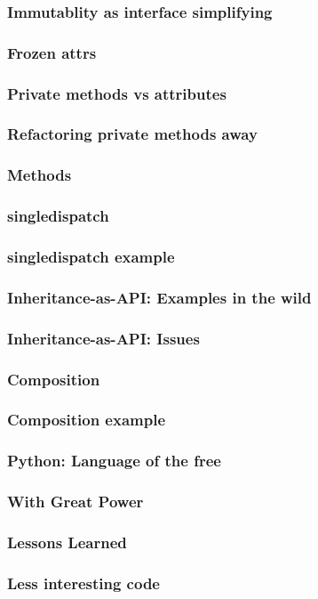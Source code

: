 \begin{frame}[fragile]
\frametitle{Immutablity as interface simplifying}
\end{frame}

\begin{frame}[fragile]
\frametitle{Frozen attrs}
\end{frame}

\begin{frame}[fragile]
\frametitle{Private methods vs attributes}
\end{frame}

\begin{frame}[fragile]
\frametitle{Refactoring private methods away}
\end{frame}

\begin{frame}[fragile]
\frametitle{Methods}
\end{frame}

\begin{frame}[fragile]
\frametitle{singledispatch}
\end{frame}

\begin{frame}[fragile]
\frametitle{singledispatch example}
\end{frame}

\begin{frame}[fragile]
\frametitle{Inheritance-as-API: Examples in the wild}
\end{frame}

\begin{frame}[fragile]
\frametitle{Inheritance-as-API: Issues}
\end{frame}

\begin{frame}[fragile]
\frametitle{Composition}
\end{frame}

\begin{frame}[fragile]
\frametitle{Composition example}
\end{frame}

\begin{frame}[fragile]
\frametitle{Python: Language of the free}
\end{frame}

\begin{frame}[fragile]
\frametitle{With Great Power}
\end{frame}

\begin{frame}[fragile]
\frametitle{Lessons Learned}
\end{frame}

\begin{frame}[fragile]
\frametitle{Less interesting code}
\end{frame}


